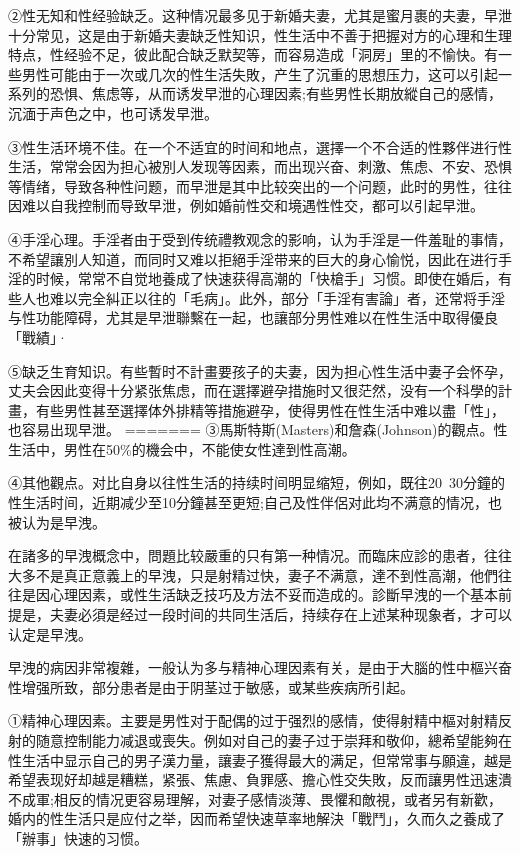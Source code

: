 \documentclass[12pt,UTF8]{ctexbook}
\begin{document}
②性无知和性经验缺乏。这种情况最多见于新婚夫妻，尤其是蜜月裹的夫妻，早泄十分常见，这是由于新婚夫妻缺乏性知识，性生活中不善于把握对方的心理和生理特点，性经验不足，彼此配合缺乏默契等，而容易造成「洞房」里的不愉快。有一些男性可能由于一次或几次的性生活失敗，产生了沉重的思想压力，这可以引起一系列的恐惧、焦虑等，从而诱发早泄的心理因素;有些男性长期放縱自己的感情，沉湎于声色之中，也可诱发早泄。

③性生活环境不佳。在一个不适宜的时间和地点，選擇一个不合适的性夥伴进行性生活，常常会因为担心被別人发现等因素，而出现兴奋、刺激、焦虑、不安、恐惧等情绪，导致各种性问题，而早泄是其中比较突出的一个问题，此时的男性，往往因难以自我控制而导致早泄，例如婚前性交和境遇性性交，都可以引起早泄。

④手淫心理。手淫者由于受到传统禮教观念的影响，认为手淫是一件羞耻的事情，不希望讓別人知道，而同时又难以拒絕手淫带来的巨大的身心愉悦，因此在进行手淫的时候，常常不自觉地養成了快速获得高潮的「快槍手」习惯。即使在婚后，有些人也难以完全糾正以往的「毛病」。此外，部分「手淫有害論」者，还常将手淫与性功能障碍，尤其是早泄聯繫在一起，也讓部分男性难以在性生活中取得優良「戰績」·

⑤缺乏生育知识。有些暫时不計畫要孩子的夫妻，因为担心性生活中妻子会怀孕，丈夫会因此变得十分紧张焦虑，而在選擇避孕措施时又很茫然，没有一个科學的計畫，有些男性甚至選擇体外排精等措施避孕，使得男性在性生活中难以盡「性」，也容易出现早泄。
=======
③馬斯特斯(Masters)和詹森(Johnson)的觀点。性生活中，男性在50\%的機会中，不能使女性達到性高潮。

④其他觀点。对比自身以往性生活的持续时间明显缩短，例如，既往20~30分鐘的性生活时间，近期减少至10分鐘甚至更短;自己及性伴侶对此均不满意的情况，也被认为是早洩。

在諸多的早洩概念中，問題比较嚴重的只有第一种情况。而臨床应診的患者，往往大多不是真正意義上的早洩，只是射精过快，妻子不满意，達不到性高潮，他們往往是因心理因素，或性生活缺乏技巧及方法不妥而造成的。診斷早洩的一个基本前提是，夫妻必須是经过一段时间的共同生活后，持续存在上述某种现象者，才可以认定是早洩。

早洩的病因非常複雜，一般认为多与精神心理因素有关，是由于大腦的性中樞兴奋性增强所致，部分患者是由于阴茎过于敏感，或某些疾病所引起。

①精神心理因素。主要是男性对于配偶的过于强烈的感情，使得射精中樞对射精反射的随意控制能力减退或喪失。例如对自己的妻子过于崇拜和敬仰，總希望能夠在性生活中显示自己的男子漢力量，讓妻子獲得最大的满足，但常常事与願違，越是希望表现好却越是糟糕，紧張、焦慮、負罪感、擔心性交失敗，反而讓男性迅速潰不成軍;相反的情况更容易理解，对妻子感情淡薄、畏懼和敵視，或者另有新歡，婚内的性生活只是应付之举，因而希望快速草率地解決「戰鬥」，久而久之養成了「辦事」快速的习惯。
\end{document}
